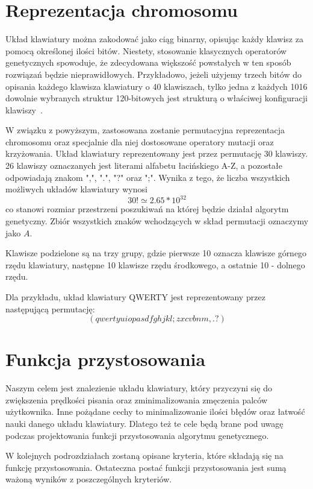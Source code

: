 \documentclass[brudnopis]{xmgr}
\begin{document}
\section{Reprezentacja chromosomu}

Układ klawiatury można zakodować jako ciąg binarny, opisując każdy klawisz za pomocą określonej ilości bitów. Niestety, stosowanie klasycznych operatorów genetycznych spowoduje, że zdecydowana większość powstałych w ten sposób rozwiązań będzie nieprawidłowych. Przykładowo, jeżeli użyjemy trzech bitów do opisania każdego klawisza klawiatury o 40 klawiszach, tylko jedna z każdych 1016 dowolnie wybranych struktur 120-bitowych jest strukturą o właściwej konfiguracji klawiszy~\cite{GloverKey}.

W związku z powyższym, zastosowana zostanie permutacyjna reprezentacja chromosomu oraz specjalnie dla niej dostosowane operatory mutacji oraz krzyżowania. Układ klawiatury reprezentowany jest przez permutację 30 klawiszy. 26 klawiszy oznaczanych jest literami alfabetu łacińskiego A-Z, a pozostałe odpowiadają znakom ",", ".", "?" oraz ";". Wynika z tego, że liczba wszystkich możliwych układów klawiatury wynosi $$ 30! \simeq 2.65 * 10^{32} $$ co stanowi rozmiar przestrzeni poszukiwań na której będzie działał algorytm genetyczny. Zbiór wszystkich znaków wchodzących w skład permutacji oznaczymy jako $ A $.

Klawisze podzielone są na trzy grupy, gdzie pierwsze 10 oznacza klawisze górnego rzędu klawiatury, następne 10 klawisze rzędu środkowego, a ostatnie 10 - dolnego rzędu.

Dla przykładu, układ klawiatury QWERTY jest reprezentowany przez następującą permutację:
$$ (qwertyuiopasdfghjkl;zxcvbnm,.?) $$


\section{Funkcja przystosowania}

Naszym celem jest znalezienie układu klawiatury, który przyczyni się do zwiększenia prędkości pisania oraz zminimalizowania zmęczenia palców użytkownika. Inne pożądane cechy to minimalizowanie ilości błędów oraz łatwość nauki danego układu klawiatury. Dlatego też te cele będą brane pod uwagę podczas projektowania funkcji przystosowania algorytmu genetycznego.

W kolejnych podrozdziałach zostaną opisane kryteria, które składają się na funkcję przystosowania. Ostateczna postać funkcji przystosowania jest sumą ważoną wyników z poszczególnych kryteriów.
\end{document}
